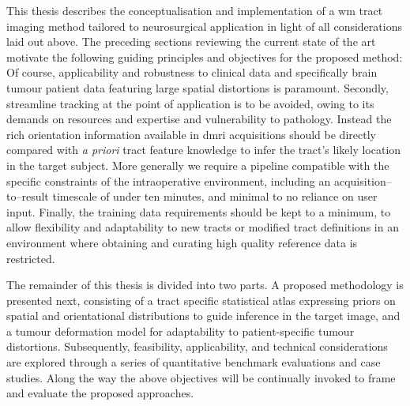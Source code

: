 This thesis describes the conceptualisation and implementation of a \gls{wm} tract imaging method tailored to neurosurgical application in light of all considerations laid out above.
The preceding sections reviewing the current state of the art motivate the following guiding principles and objectives for the proposed method:
Of course, applicability and robustness to clinical data and specifically brain tumour patient data featuring large spatial distortions is paramount.
Secondly, streamline tracking at the point of application is to be avoided, owing to its demands on resources and expertise and vulnerability to pathology.
Instead the rich orientation information available in \gls{dmri} acquisitions should be directly compared with \textit{a priori} tract feature knowledge to infer the tract's likely location in the target subject.
More generally we require a pipeline compatible with the specific constraints of the intraoperative environment, including an acquisition--to--result timescale of under ten minutes, and minimal to no reliance on user input.
Finally, the training data requirements should be kept to a minimum, to allow flexibility and adaptability to new tracts or modified tract definitions in an environment where obtaining and curating high quality reference data is restricted.

The remainder of this thesis is divided into two parts.
A proposed methodology is presented next, consisting of a tract specific statistical atlas expressing priors on spatial and orientational distributions to guide inference in the target image, and a tumour deformation model for adaptability to patient-specific tumour distortions.
Subsequently, feasibility, applicability, and technical considerations are explored through a series of quantitative benchmark evaluations and case studies.
Along the way the above objectives will be continually invoked to frame and evaluate the proposed approaches.
